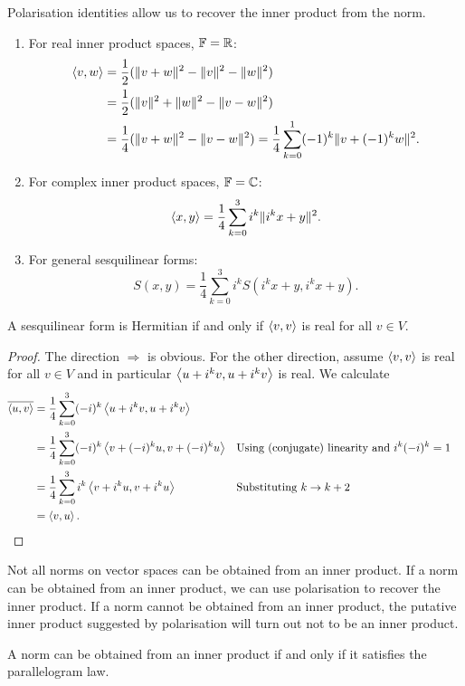 \begin{theorem} \label{theorem:polarisationIdentities}
Polarisation identities allow us to recover the inner product from the norm.
\begin{enumerate}
\item For real inner product spaces, $\mathbb{F} = \mathbb{R}$:
\begin{align*}
\left\langle v,w \right\rangle &= \frac{1}{2}(\lVert v+w\rVert^2 - \lVert v\rVert^2-\lVert w\rVert^2) \\
&= \frac{1}{2}(\lVert v\rVert^2 + \lVert w\rVert^2-\lVert v-w\rVert^2) \\
&= \frac{1}{4}(\lVert v+w\rVert^2 - \lVert v-w\rVert^2) = \frac{1}{4}\sum_{k=0}^1 (-1)^k\lVert v+(-1)^k w\rVert^2.
\end{align*}
\item For complex inner product spaces, $\mathbb{F} = \mathbb{C}$:
\[ \left\langle x,y \right\rangle = \frac{1}{4}\sum_{k=0}^3 i^k\lVert i^k x+y\rVert^2. \]
\item For general sesquilinear forms:
\[ S(x,y) = \frac{1}{4}\sum_{k=0}^3 i^k S(i^k x+y, i^k x+y). \]
\end{enumerate}
\end{theorem}
\begin{corollary}
A sesquilinear form is Hermitian \textup{if and only if} $\left\langle v,v \right\rangle$ is real for all $v\in V$.
\end{corollary}
\begin{proof}
The direction $\Rightarrow$ is obvious. For the other direction, assume $\left\langle v,v \right\rangle$ is real for all $v\in V$ and in particular $\left\langle u+i^kv,u+i^kv \right\rangle$ is real. We calculate
\begin{align*}
\overline{\left\langle u,v \right\rangle} &= \frac{1}{4}\sum^3_{k=0}(-i)^k\left\langle u+i^kv,u+i^kv \right\rangle \\
&= \frac{1}{4}\sum^3_{k=0}(-i)^k\left\langle v+(-i)^ku,v+(-i)^ku \right\rangle & &\text{Using (conjugate) linearity and $i^k(-i)^k=1$}\\
&= \frac{1}{4}\sum^3_{k=0}i^k\left\langle v+i^ku,v+i^ku \right\rangle & &\text{Substituting $k\to k+2$}\\
&= \left\langle v,u \right\rangle.
\end{align*}
\end{proof}
Not all norms on vector spaces can be obtained from an inner product. If a norm can be obtained from an inner product, we can use polarisation to recover the inner product. If a norm cannot be obtained from an inner product, the putative inner product suggested by polarisation will turn out not to be an inner product.
\begin{proposition}
A norm can be obtained from an inner product \textup{if and only if} it satisfies the parallelogram law.
\end{proposition}
